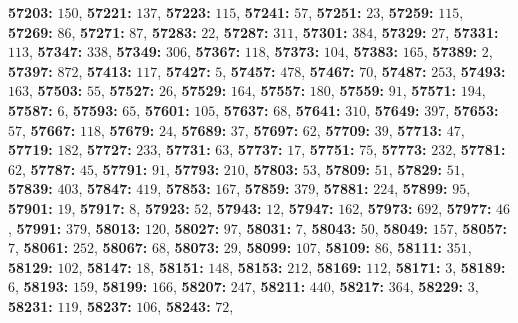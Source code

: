 \textsf{\bfseries 57203:} $150$, \textsf{\bfseries 57221:} $137$, \textsf{\bfseries 57223:} $115$, \textsf{\bfseries 57241:} $57$, \textsf{\bfseries 57251:} $23$, \textsf{\bfseries 57259:} $115$, \textsf{\bfseries 57269:} $86$, \textsf{\bfseries 57271:} $87$, \textsf{\bfseries 57283:} $22$, \textsf{\bfseries 57287:} $311$, \textsf{\bfseries 57301:} $384$, \textsf{\bfseries 57329:} $27$, \textsf{\bfseries 57331:} $113$, \textsf{\bfseries 57347:} $338$, \textsf{\bfseries 57349:} $306$, \textsf{\bfseries 57367:} $118$, \textsf{\bfseries 57373:} $104$, \textsf{\bfseries 57383:} $165$, \textsf{\bfseries 57389:} $2$, \textsf{\bfseries 57397:} $872$, \textsf{\bfseries 57413:} $117$, \textsf{\bfseries 57427:} $5$, \textsf{\bfseries 57457:} $478$, \textsf{\bfseries 57467:} $70$, \textsf{\bfseries 57487:} $253$, \textsf{\bfseries 57493:} $163$, \textsf{\bfseries 57503:} $55$, \textsf{\bfseries 57527:} $26$, \textsf{\bfseries 57529:} $164$, \textsf{\bfseries 57557:} $180$, \textsf{\bfseries 57559:} $91$, \textsf{\bfseries 57571:} $194$, \textsf{\bfseries 57587:} $6$, \textsf{\bfseries 57593:} $65$, \textsf{\bfseries 57601:} $105$, \textsf{\bfseries 57637:} $68$, \textsf{\bfseries 57641:} $310$, \textsf{\bfseries 57649:} $397$, \textsf{\bfseries 57653:} $57$, \textsf{\bfseries 57667:} $118$, \textsf{\bfseries 57679:} $24$, \textsf{\bfseries 57689:} $37$, \textsf{\bfseries 57697:} $62$, \textsf{\bfseries 57709:} $39$, \textsf{\bfseries 57713:} $47$, \textsf{\bfseries 57719:} $182$, \textsf{\bfseries 57727:} $233$, \textsf{\bfseries 57731:} $63$, \textsf{\bfseries 57737:} $17$, \textsf{\bfseries 57751:} $75$, \textsf{\bfseries 57773:} $232$, \textsf{\bfseries 57781:} $62$, \textsf{\bfseries 57787:} $45$, \textsf{\bfseries 57791:} $91$, \textsf{\bfseries 57793:} $210$, \textsf{\bfseries 57803:} $53$, \textsf{\bfseries 57809:} $51$, \textsf{\bfseries 57829:} $51$, \textsf{\bfseries 57839:} $403$, \textsf{\bfseries 57847:} $419$, \textsf{\bfseries 57853:} $167$, \textsf{\bfseries 57859:} $379$, \textsf{\bfseries 57881:} $224$, \textsf{\bfseries 57899:} $95$, \textsf{\bfseries 57901:} $19$, \textsf{\bfseries 57917:} $8$, \textsf{\bfseries 57923:} $52$, \textsf{\bfseries 57943:} $12$, \textsf{\bfseries 57947:} $162$, \textsf{\bfseries 57973:} $692$, \textsf{\bfseries 57977:} $46$, \textsf{\bfseries 57991:} $379$, \textsf{\bfseries 58013:} $120$, \textsf{\bfseries 58027:} $97$, \textsf{\bfseries 58031:} $7$, \textsf{\bfseries 58043:} $50$, \textsf{\bfseries 58049:} $157$, \textsf{\bfseries 58057:} $7$, \textsf{\bfseries 58061:} $252$, \textsf{\bfseries 58067:} $68$, \textsf{\bfseries 58073:} $29$, \textsf{\bfseries 58099:} $107$, \textsf{\bfseries 58109:} $86$, \textsf{\bfseries 58111:} $351$, \textsf{\bfseries 58129:} $102$, \textsf{\bfseries 58147:} $18$, \textsf{\bfseries 58151:} $148$, \textsf{\bfseries 58153:} $212$, \textsf{\bfseries 58169:} $112$, \textsf{\bfseries 58171:} $3$, \textsf{\bfseries 58189:} $6$, \textsf{\bfseries 58193:} $159$, \textsf{\bfseries 58199:} $166$, \textsf{\bfseries 58207:} $247$, \textsf{\bfseries 58211:} $440$, \textsf{\bfseries 58217:} $364$, \textsf{\bfseries 58229:} $3$, \textsf{\bfseries 58231:} $119$, \textsf{\bfseries 58237:} $106$, \textsf{\bfseries 58243:} $72$, 
